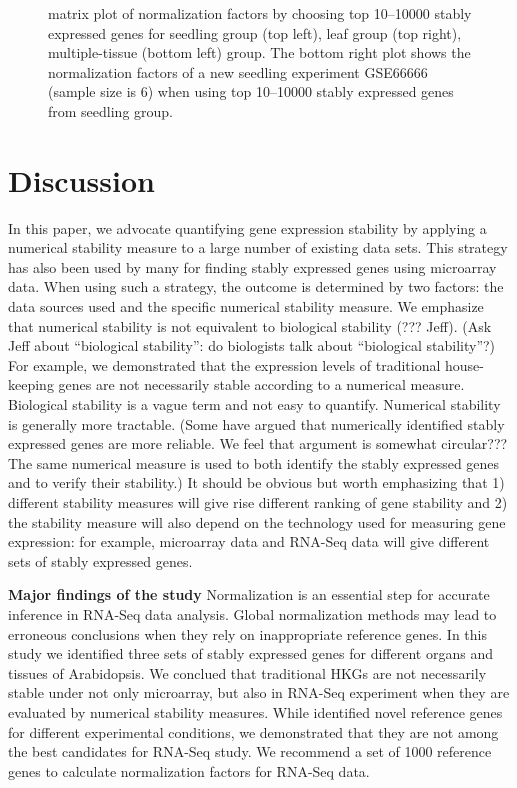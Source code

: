 \documentclass[11pt, a4paper]{article}
\begin{document}
\begin{figure}[h!]
\begin{center}
\caption{\label{fig:normfactor} matrix plot of normalization factors by choosing top 10--10000 stably expressed genes for seedling group (top left), leaf group (top right), multiple-tissue (bottom left) group. The bottom right plot shows the normalization factors of a new seedling experiment GSE66666 (sample size is 6) when using top 10--10000 stably expressed genes from seedling group.}
\end{center}
\end{figure}

  \section{Discussion}
In this paper, we advocate quantifying gene expression stability by applying a
numerical stability measure to a large number of existing data sets.  This
strategy has also been used by many for finding stably expressed genes using
microarray data.  When using such a strategy, the outcome is determined by two
factors: the data sources used and the specific numerical stability measure.
We emphasize that numerical stability is not equivalent to biological
stability (??? Jeff).  (Ask Jeff about  ``biological stability'': do
biologists talk about ``biological stability''?) For example, we demonstrated
that the expression levels of traditional house-keeping genes are not
necessarily stable according to a numerical measure. 
Biological stability is a vague term and not easy to quantify.  Numerical
stability is generally more tractable. (Some have argued that numerically
identified stably expressed genes are more reliable. We feel that argument is
somewhat circular??? The same numerical measure is used to both identify the
stably expressed genes and to verify their stability.) It should be obvious
but worth emphasizing that 1) different stability measures will give rise
different ranking of gene stability and 2) the stability measure will also
depend on the technology used for measuring gene expression: for example,
microarray data and RNA-Seq data will give different sets of stably expressed
genes.


  \textbf{Major findings of the study}
  Normalization is an essential step for accurate inference in RNA-Seq data analysis. Global normalization methods may lead to erroneous conclusions when they rely on inappropriate reference genes. In this study we identified three sets of stably expressed genes for different organs and tissues of Arabidopsis. We conclued that traditional HKGs are not necessarily stable under not only microarray, but also in RNA-Seq experiment when they are evaluated by numerical stability measures. While \cite{czechowski2005genome} identified novel reference genes for different experimental conditions, we demonstrated that they are not among the best candidates for RNA-Seq study. We recommend a set of 1000 reference genes to calculate normalization factors for RNA-Seq data.  
   
\end{document}
